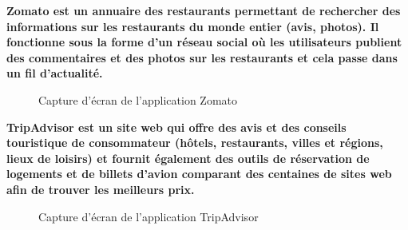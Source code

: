 \bf{Zomato} est un annuaire des restaurants permettant de rechercher des informations sur les restaurants du monde entier (avis, photos). Il fonctionne sous la forme d'un réseau social où les utilisateurs publient des commentaires et des photos sur les restaurants et cela passe dans un fil d'actualité.

\begin{figure}[H]
    \label{fig-zomato}
    \noindent{}
    \caption{Capture d'écran de l'application Zomato}
\end{figure}

\bf{TripAdvisor} est un site web qui offre des avis et des conseils touristique de consommateur (hôtels, restaurants, villes et régions, lieux de loisirs) et fournit également des outils de réservation de logements et de billets d'avion comparant des centaines de sites web afin de trouver les meilleurs prix.

\begin{figure}[H]
    \label{fig-trip-advisor}
    \noindent{}
    \caption{Capture d'écran de l'application TripAdvisor}
\end{figure}

